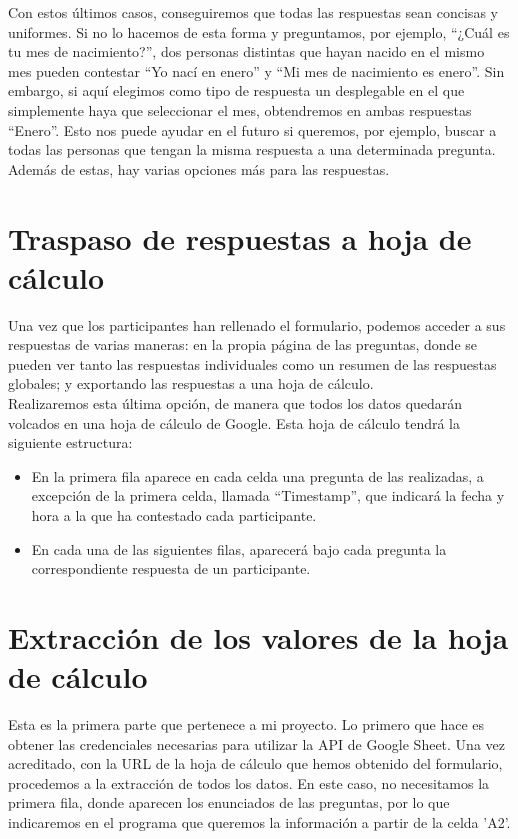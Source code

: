 \documentclass[a4paper, 12pt]{book}
\begin{document}
Con estos últimos casos, conseguiremos que todas las respuestas sean concisas y uniformes. Si no lo hacemos de esta forma y preguntamos, por ejemplo, ``¿Cuál es tu mes de nacimiento?'', dos personas distintas que hayan nacido en el mismo mes pueden contestar ``Yo nací en enero'' y ``Mi mes de nacimiento es enero''. Sin embargo, si aquí elegimos como tipo de respuesta un desplegable en el que simplemente haya que seleccionar el mes, obtendremos en ambas respuestas ``Enero''. Esto nos puede ayudar en el futuro si queremos, por ejemplo, buscar a todas las personas que tengan la misma respuesta a una determinada pregunta.\\

Además de estas, hay varias opciones más para las respuestas.


\section{Traspaso de respuestas a hoja de cálculo}
\label{sec:pasaraExcel}
Una vez que los participantes han rellenado el formulario, podemos acceder a sus respuestas de varias maneras: en la propia página de las preguntas, donde se pueden ver tanto las respuestas individuales como un resumen de las respuestas globales; y exportando las respuestas a una hoja de cálculo.\\

Realizaremos esta última opción, de manera que todos los datos quedarán volcados en una hoja de cálculo de Google. Esta hoja de cálculo tendrá la siguiente estructura:
\begin{itemize}
	\item En la primera fila aparece en cada celda una pregunta de las realizadas, a excepción de la primera celda, llamada ``Timestamp'', que indicará la fecha y hora a la que ha contestado cada participante.
	\item En cada una de las siguientes filas, aparecerá bajo cada pregunta la correspondiente respuesta de un participante.
\end{itemize}


\section{Extracción de los valores de la hoja de cálculo}
\label{sec:extraerExcel}
Esta es la primera parte que pertenece a mi proyecto. Lo primero que hace es obtener las credenciales necesarias para utilizar la API de Google Sheet. Una vez acreditado, con la URL de la hoja de cálculo que hemos obtenido del formulario, procedemos a la extracción de todos los datos. En este caso, no necesitamos la primera fila, donde aparecen los enunciados de las preguntas, por lo que indicaremos en el programa que queremos la información a partir de la celda 'A2'.\\
\end{document}
